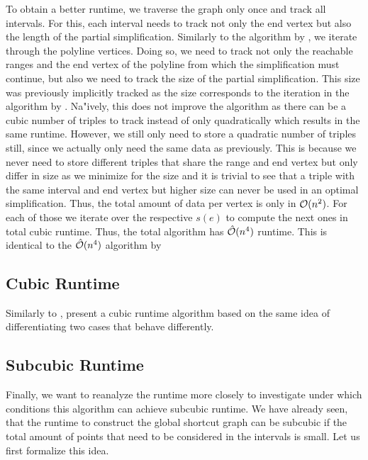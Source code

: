 To obtain a better runtime, we traverse the graph only once and track all intervals. For this, each interval needs to track not only the end vertex but also the length of the partial simplification. Similarly to the algorithm by \citeauthor{polyline_simplification_has_cubic_complexity_bringmannetal}, we iterate through the polyline vertices. Doing so, we need to track not only the reachable ranges and the end vertex of the polyline from which the simplification must continue, but also we need to track the size of the partial simplification. This size was previously implicitly tracked as the size corresponds to the iteration in the algorithm by \citeauthor{on_optimal_polyline_simplification_using_the_hausdorff_and_frechet_distance}. Na"ively, this does not improve the algorithm as there can be a cubic number of triples to track instead of only quadratically which results in the same runtime. However, we still only need to store a quadratic number of triples still, since we actually only need the same data as previously. This is because we never need to store different triples that share the range and end vertex but only differ in size as we minimize for the size and it is trivial to see that a triple with the same interval and end vertex but higher size can never be used in an optimal simplification. Thus, the total amount of data per vertex is only in \(\mathcal{O}(n^2)\). For each of those we iterate over the respective \(s(e)\) to compute the next ones in total cubic runtime. Thus, the total algorithm has \(\hat{\mathcal{O}}(n^4)\) runtime. This is identical to the \(\hat{\mathcal{O}}(n^4)\) algorithm by \citeauthor{global_curve_simplification}

\subsection{Cubic Runtime}
Similarly to \citeauthor{polyline_simplification_has_cubic_complexity_bringmannetal}, \citeauthor{global_curve_simplification} present a cubic runtime algorithm based on the same idea of differentiating two cases that behave differently. 






\subsection{Subcubic Runtime}
Finally, we want to reanalyze the runtime more closely to investigate under which conditions this algorithm can achieve subcubic runtime. We have already seen, that the runtime to construct the global shortcut graph can be subcubic if the total amount of points that need to be considered in the intervals is small. Let us first formalize this idea.








